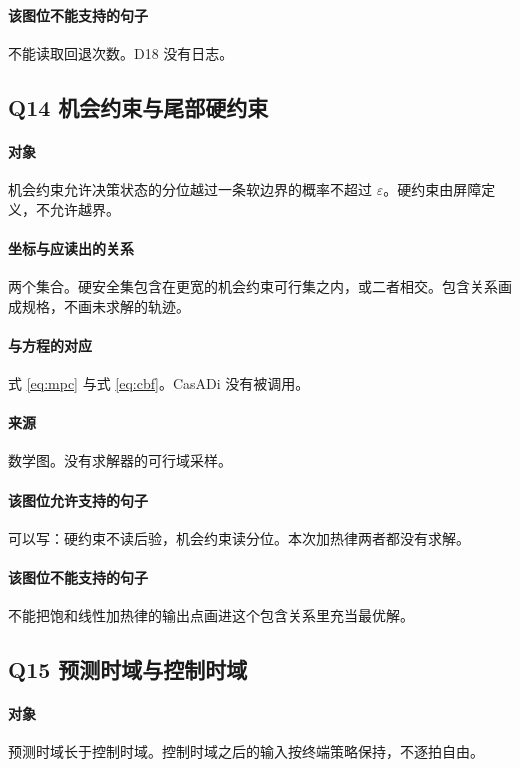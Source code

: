 \paragraph{该图位不能支持的句子}
不能读取回退次数。D18 没有日志。

\subsection{Q14 机会约束与尾部硬约束}
\paragraph{对象}
机会约束允许决策状态的分位越过一条软边界的概率不超过 $\varepsilon$。硬约束由屏障定义，不允许越界。

\paragraph{坐标与应读出的关系}
两个集合。硬安全集包含在更宽的机会约束可行集之内，或二者相交。包含关系画成规格，不画未求解的轨迹。

\paragraph{与方程的对应}
式 \eqref{eq:mpc} 与式 \eqref{eq:cbf}。CasADi 没有被调用。

\paragraph{来源}
数学图。没有求解器的可行域采样。

\paragraph{该图位允许支持的句子}
可以写：硬约束不读后验，机会约束读分位。本次加热律两者都没有求解。

\paragraph{该图位不能支持的句子}
不能把饱和线性加热律的输出点画进这个包含关系里充当最优解。

\subsection{Q15 预测时域与控制时域}
\paragraph{对象}
预测时域长于控制时域。控制时域之后的输入按终端策略保持，不逐拍自由。


